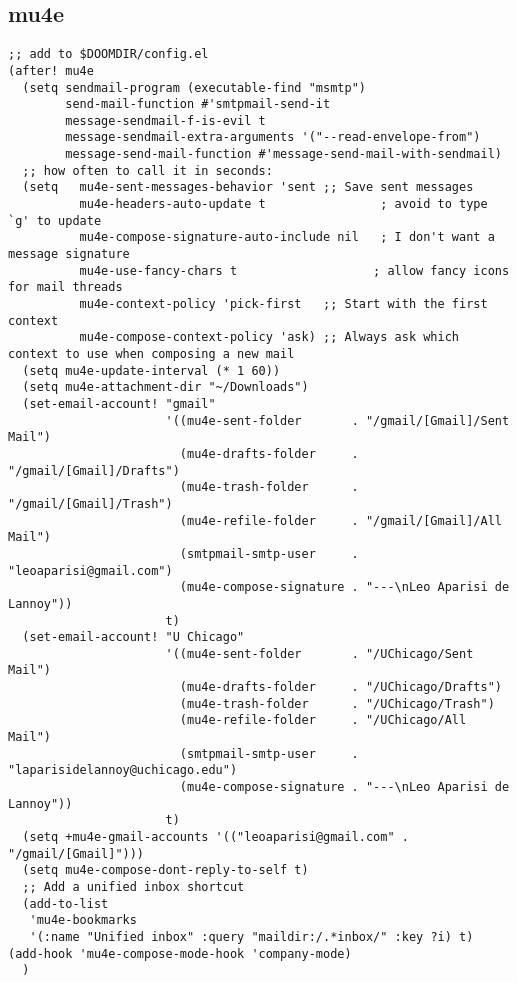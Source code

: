 \documentclass[c]{article}
\theoremstyle{plain}%
\theoremstyle{definition}
\theoremstyle{remark}
\begin{document}
\subsection{mu4e}
\label{sec:org2785c0b}
\begin{verbatim}
;; add to $DOOMDIR/config.el
(after! mu4e
  (setq sendmail-program (executable-find "msmtp")
        send-mail-function #'smtpmail-send-it
        message-sendmail-f-is-evil t
        message-sendmail-extra-arguments '("--read-envelope-from")
        message-send-mail-function #'message-send-mail-with-sendmail)
  ;; how often to call it in seconds:
  (setq   mu4e-sent-messages-behavior 'sent ;; Save sent messages
          mu4e-headers-auto-update t                ; avoid to type `g' to update
          mu4e-compose-signature-auto-include nil   ; I don't want a message signature
          mu4e-use-fancy-chars t                   ; allow fancy icons for mail threads
          mu4e-context-policy 'pick-first   ;; Start with the first context
          mu4e-compose-context-policy 'ask) ;; Always ask which context to use when composing a new mail
  (setq mu4e-update-interval (* 1 60))
  (setq mu4e-attachment-dir "~/Downloads")
  (set-email-account! "gmail"
                      '((mu4e-sent-folder       . "/gmail/[Gmail]/Sent Mail")
                        (mu4e-drafts-folder     . "/gmail/[Gmail]/Drafts")
                        (mu4e-trash-folder      . "/gmail/[Gmail]/Trash")
                        (mu4e-refile-folder     . "/gmail/[Gmail]/All Mail")
                        (smtpmail-smtp-user     . "leoaparisi@gmail.com")
                        (mu4e-compose-signature . "---\nLeo Aparisi de Lannoy"))
                      t)
  (set-email-account! "U Chicago"
                      '((mu4e-sent-folder       . "/UChicago/Sent Mail")
                        (mu4e-drafts-folder     . "/UChicago/Drafts")
                        (mu4e-trash-folder      . "/UChicago/Trash")
                        (mu4e-refile-folder     . "/UChicago/All Mail")
                        (smtpmail-smtp-user     . "laparisidelannoy@uchicago.edu")
                        (mu4e-compose-signature . "---\nLeo Aparisi de Lannoy"))
                      t)
  (setq +mu4e-gmail-accounts '(("leoaparisi@gmail.com" . "/gmail/[Gmail]")))
  (setq mu4e-compose-dont-reply-to-self t)
  ;; Add a unified inbox shortcut
  (add-to-list
   'mu4e-bookmarks
   '(:name "Unified inbox" :query "maildir:/.*inbox/" :key ?i) t)
(add-hook 'mu4e-compose-mode-hook 'company-mode)
  )
\end{verbatim}
\end{document}
